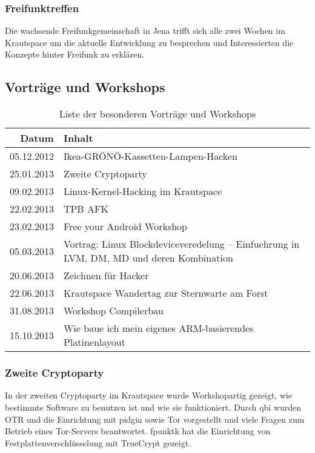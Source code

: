 \documentclass[10pt,DIV16]{scrartcl}
\begin{document}
\subsubsection{Freifunktreffen}

Die wachsende Freifunkgemeinschaft in Jena trifft sich alle zwei Wochen im 
Krautspace um die aktuelle Entwicklung zu besprechen und Interessierten die 
Konzepte hinter Freifunk zu erklären. 

\subsection{Vorträge und Workshops}

\begin{table}[h]
\begin{tabular}{r|l}
	\textbf{Datum} & \textbf{Inhalt} \\ \hline{}
	05.12.2012 & Ikea-GRÖNÖ-Kassetten-Lampen-Hacken\\
    25.01.2013 & Zweite Cryptoparty\\
	09.02.2013 & Linux-Kernel-Hacking im Krautspace\\
	22.02.2013 & TPB AFK\\
	23.02.2013 & Free your Android Workshop\\
	05.03.2013 & Vortrag: Linux Blockdeviceveredelung -- Einfuehrung in LVM, DM, MD und deren Kombination\\
	20.06.2013 & Zeichnen für Hacker\\
	22.06.2013 & Krautspace Wandertag zur Sternwarte am Forst\\
	31.08.2013 & Workshop Compilerbau\\
	15.10.2013 & Wie baue ich mein eigenes ARM-basierendes Platinenlayout
	\end{tabular}
	\caption{Liste der besonderen Vorträge und Workshops}
\end{table}

\subsubsection{Zweite Cryptoparty}

In der zweiten Cryptoparty im Krautspace wurde Workshopartig gezeigt, wie 
bestimmte Software zu benutzen ist und wie sie funktioniert. Durch qbi 
wurden OTR und die Einrichtung mit pidgin sowie Tor vorgestellt und viele 
Fragen zum Betrieb eines Tor-Servers beantwortet. fpunktk hat die Einrichtung 
von Festplattenverschlüsselung mit TrueCrypt gezeigt. 
\end{document}
